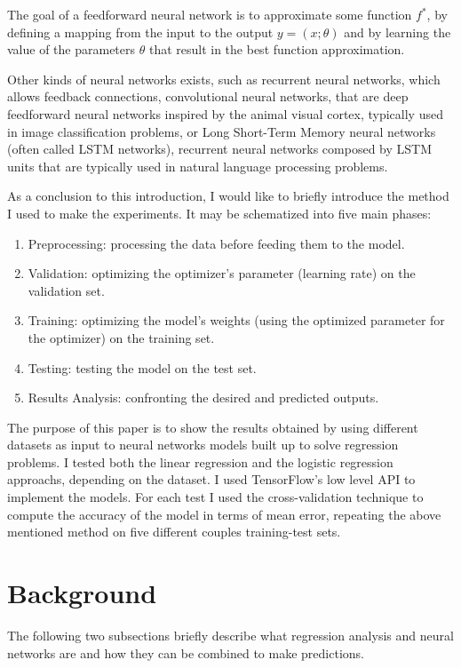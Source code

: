 \documentclass[10pt,journal,A4paper,compsoc,epsfig]{IEEEtran}
\begin{document}
The goal of a feedforward neural network is to approximate some function $f^*$, by defining a mapping from the input to the output $y=(x;\theta)$ and by learning the value of the parameters $\theta$ that result in the best function approximation.

Other kinds of neural networks exists, such as recurrent neural networks, which allows feedback connections, convolutional neural networks, that are deep feedforward neural networks inspired by the animal visual cortex, typically used in image classification problems, or Long Short-Term Memory neural networks (often called LSTM networks), recurrent neural networks composed by LSTM units that are typically used in natural language processing problems.

As a conclusion to this introduction, I would like to briefly introduce the method I used to make the experiments. It may be schematized into five main phases:
\begin{enumerate}
\item Preprocessing: processing the data before feeding them to the model.
\item Validation: optimizing the optimizer's parameter (learning rate) on the validation set.
\item Training: optimizing the model's weights (using the optimized parameter for the optimizer) on the training set.
\item Testing: testing the model on the test set.
\item Results Analysis: confronting the desired and predicted outputs.
\end{enumerate}

The purpose of this paper is to show the results obtained by using different datasets as input to neural networks models built up to solve regression problems. I tested both the linear regression and the logistic regression approachs, depending on the dataset. I used TensorFlow's low level API to implement the models. For each test I used the cross-validation technique to compute the accuracy of the model in terms of mean error, repeating the above mentioned method on five different couples training-test sets.


\section{Background}
\label{background}
The following two subsections briefly describe what regression analysis and neural networks are and how they can be combined to make predictions.
\end{document}
